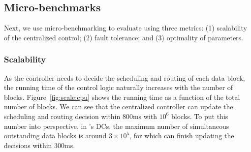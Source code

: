 

\subsection{Micro-benchmarks}
\label{subsec:evaluation:benchmarks}

Next, we use micro-benchmarking to evaluate \name using three metrics:
(1) scalability of the centralized control;
(2) fault tolerance; and
(3) optimality of \name parameters.

\subsubsection{Scalability}
\label{subsec:evaluation:benchmarks:scalability}

As the controller needs to decide the scheduling and routing of each
data block, the running time of the control logic naturally increases
with the number of blocks. Figure~\ref{fig:scale:cpu} shows the
running time as a function of the total number of blocks. We can see
that the centralized \name controller can update the scheduling and
routing decision within 800ms with $10^6$ blocks. To put this number
into perspective, in \company's DCs, the maximum number of simultaneous
outstanding data blocks is around $3\times 10^5$, for which \name can
finish updating the decisions within 300ms.

